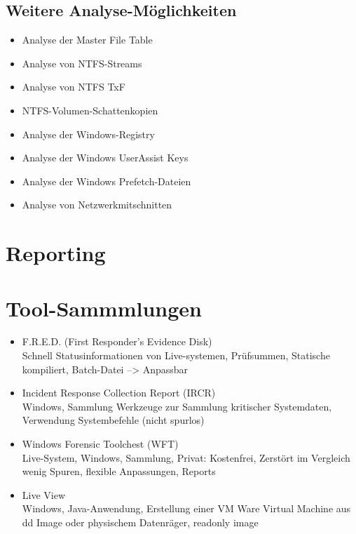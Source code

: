 \subsection{Weitere Analyse-Möglichkeiten}
\begin{itemize}
\item Analyse der Master File Table
\item Analyse von NTFS-Streams
\item Analyse von NTFS TxF
\item NTFS-Volumen-Schattenkopien
\item Analyse der Windows-Registry
\item Analyse der Windows UserAssist Keys
\item Analyse der Windows Prefetch-Dateien
\item Analyse von Netzwerkmitschnitten
\end{itemize}

\section{Reporting}





\section{Tool-Sammmlungen}
\begin{itemize}
\item F.R.E.D. (First Responder's Evidence Disk)\\
Schnell Statusinformationen von Live-systemen, Prüfsummen, Statische kompiliert, Batch-Datei --> Anpassbar
\item Incident Response Collection Report (IRCR)\\
Windows, Sammlung Werkzeuge zur Sammlung kritischer Systemdaten, Verwendung Systembefehle (nicht spurlos)
\item Windows Forensic Toolchest (WFT)\\
Live-System, Windows, Sammlung, Privat: Kostenfrei, Zerstört im Vergleich wenig Spuren, flexible Anpassungen, Reports
\item Live View\\
Windows, Java-Anwendung, Erstellung einer VM Ware Virtual Machine aus dd Image oder physischem Datenräger, readonly image
\end{itemize}

